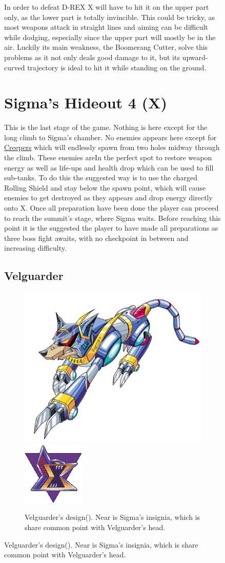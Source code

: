 \begin{figure}[htp]
In order to defeat D-REX X will have to hit it on the upper part only, as the lower part is totally invincible. This could be tricky, as most weapons attack in straight lines and aiming can be difficult while dodging, especially since the upper part will mostly be in the air. Luckily its main weakness, the Boomerang Cutter, solve this problems as it not only deals good damage to it, but its upward-curved trajectory is ideal to hit it while standing on the ground.

\section{Sigma's Hideout 4 (X)}
This is the last stage of the game. Nothing  is here except for the long climb to Sigma's chamber. No enemies appears here except for \hyperlink{enem:Creeper}{Creepers} which will endlessly spawn from two holes midway through the climb. These enemies areIn the perfect spot to restore weapon energy as well as life-ups and health drop which can be used to fill sub-tanks. To do this the suggested way is to use the charged Rolling Shield and stay below the spawn point, which will cause enemies to get destroyed as they appears and drop energy directly onto X. Once all preparation have been done the player can proceed to reach the summit's stage, where Sigma waits. Before reaching this point it is the suggested the player to have made all preparations as three boss fight awaits, with no checkpoint in between and increasing difficulty.

\subsection{Velguarder}\label{boss:Velguarder}
\begin{figure}[htp]
	\centering
	\includegraphics[width=0.4\linewidth]{figures/X1/Sigma_stages/Velguarder.jpg}
	\includegraphics{figures/X1/Sigma_stages/Sigma_logo.png}
	\caption{Velguarder's design(\cite{book:MMX_Complete_art}). Near is Sigma's insignia, which is share common point with Velguarder's head.}
\end{figure}


\end{figure}
